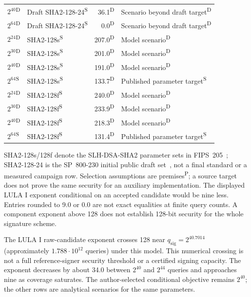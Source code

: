 \begin{table}[!htbp]
\begin{tabular}{P{12mm}P{31mm}rP{43mm}}
$2^{40}$\textsuperscript{D} & Draft SHA2-128-24\textsuperscript{S} &36.1\textsuperscript{D}&Scenario beyond draft target\textsuperscript{D}\\
$2^{64}$\textsuperscript{D} & Draft SHA2-128-24\textsuperscript{S} &0.0\textsuperscript{D}&Scenario beyond draft target\textsuperscript{D}\\\midrule
$2^{24}$\textsuperscript{D} & SHA2-128s\textsuperscript{S} &207.0\textsuperscript{D}&Model scenario\textsuperscript{D}\\
$2^{30}$\textsuperscript{D} & SHA2-128s\textsuperscript{S} &201.0\textsuperscript{D}&Model scenario\textsuperscript{D}\\
$2^{40}$\textsuperscript{D} & SHA2-128s\textsuperscript{S} &191.0\textsuperscript{D}&Model scenario\textsuperscript{D}\\
$2^{64}$\textsuperscript{S} & SHA2-128s\textsuperscript{S} &133.7\textsuperscript{D}&Published parameter target\textsuperscript{S}\\\midrule
$2^{24}$\textsuperscript{D} & SHA2-128f\textsuperscript{S} &240.0\textsuperscript{D}&Model scenario\textsuperscript{D}\\
$2^{30}$\textsuperscript{D} & SHA2-128f\textsuperscript{S} &233.9\textsuperscript{D}&Model scenario\textsuperscript{D}\\
$2^{40}$\textsuperscript{D} & SHA2-128f\textsuperscript{S} &218.3\textsuperscript{D}&Model scenario\textsuperscript{D}\\
$2^{64}$\textsuperscript{S} & SHA2-128f\textsuperscript{S} &131.4\textsuperscript{D}&Published parameter target\textsuperscript{S}\\\bottomrule
\end{tabular}
\smallskip\par\raggedright\footnotesize SHA2-128s/128f denote the SLH-DSA-SHA2 parameter sets in FIPS~205~\cite{fips205}; SHA2-128-24 is the SP~800-230 initial public draft set~\cite[Table~1 and Section~3]{sp800230}, not a final standard or a measured campaign row. Selection assumptions are premises\textsuperscript{P}; a source target does not prove the same security for an auxiliary implementation. The displayed LULA I exponent conditional on an accepted candidate would be nine less. Entries rounded to 9.0 or 0.0 are not exact equalities at finite query counts. A component exponent above 128 does not establish 128-bit security for the whole signature scheme.
\end{table}

The LULA I raw-candidate exponent crosses 128 near $q_{\mathrm{sig}}=2^{40.7014}$ (approximately $1.788\cdot10^{12}$ queries) under this model. This numerical crossing is not a full reference-signer security threshold or a certified signing capacity. The exponent decreases by about 34.0 between $2^{40}$ and $2^{44}$ queries and approaches nine as coverage saturates. The author-selected conditional objective remains $2^{40}$; the other rows are analytical scenarios for the same parameters.

